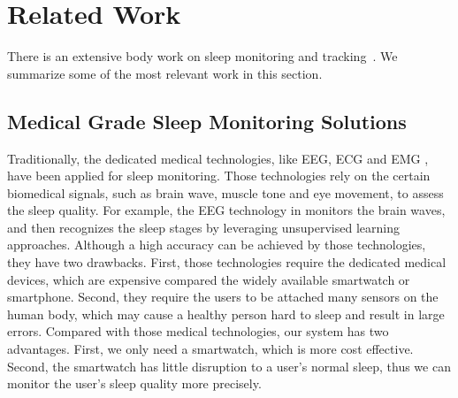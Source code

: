 \section{Related Work}\label{sec:5related}


There is an extensive body work on sleep monitoring and
tracking~\cite{langkvist2012sleep,hao2013isleep,bai2012will,kay2012lullaby,bain2003evaluation,pombo2016ubisleep}. We summarize some of the
most relevant work in this section.

\subsection{Medical Grade Sleep Monitoring Solutions}
Traditionally, the dedicated medical technologies, like EEG, ECG and EMG \cite{saper2005hypothalamic}, have been applied for sleep
monitoring. Those technologies rely on the certain biomedical signals, such as brain wave, muscle tone and eye movement, to assess the
sleep quality. For example, the EEG technology in \cite{langkvist2012sleep,oropesa1999sleep,ebrahimi2008automatic} monitors the brain
waves, and then recognizes the sleep stages by leveraging unsupervised learning approaches. Although a high accuracy can be achieved by
those technologies, they have two drawbacks. First, those  technologies require the dedicated medical devices, which are expensive compared
the widely available smartwatch or smartphone. Second, they require the users to be attached many sensors on the human body, which may
cause a healthy person hard to sleep and result in large errors. Compared with those medical technologies, our system has two advantages.
First, we only need a smartwatch, which is more cost effective. Second, the smartwatch has little disruption to a user's normal sleep, thus
we can monitor the user's sleep quality more precisely.

